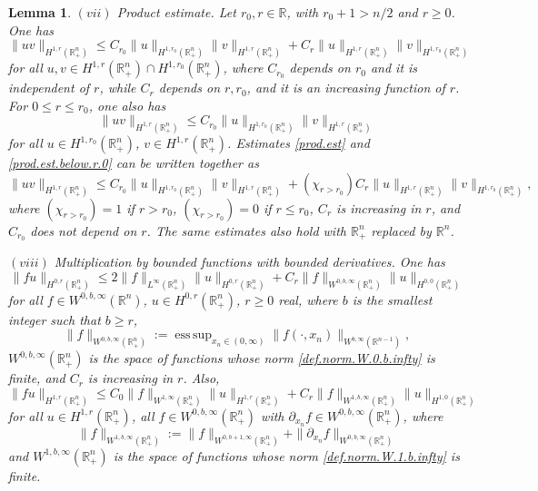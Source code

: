 \documentclass[10pt,reqno,a4paper]{article}
\numberwithin{equation}{section}
\theoremstyle{plain}
\newtheorem{lemma}[theorem]{Lemma}
\theoremstyle{definition}
\newcommand{\R}{{\mathbb R}}
\newcommand{\pa}{\partial}
\DeclareMathOperator*{\esssup}{ess\,sup}
\begin{document}
\begin{lemma}
$(vii)$ \emph{Product estimate}.
Let $r_0, r \in \R$, with $r_0 + 1 > n/2$ and $r \geq 0$. 
One has 
\begin{equation} \label{prod.est}
\| uv \|_{H^{1,r}(\R^n_+)} 
\leq C_{r_0} \| u \|_{H^{1,r_0}(\R^n_+)} \| v \|_{H^{1,r}(\R^n_+)} 
+ C_r \| u \|_{H^{1,r}(\R^n_+)} \| v \|_{H^{1,r_0}(\R^n_+)}
\end{equation}
for all $u,v \in H^{1,r}(\R^n_+) \cap H^{1, r_0}(\R^n_+)$, 
where $C_{r_0}$ depends on $r_0$ and it is independent of $r$, 
while $C_r$ depends on $r, r_0$, 
and it is an increasing function of $r$. 
For $0 \leq r \leq r_0$, one also has
\begin{equation} \label{prod.est.below.r.0}
\| uv \|_{H^{1,r}(\R^n_+)} 
\leq C_{r_0} \| u \|_{H^{1,r_0}(\R^n_+)} \| v \|_{H^{1,r}(\R^n_+)} 
\end{equation}
for all $u \in H^{1,r_0}(\R^n_+)$, 
$v \in H^{1,r}(\R^n_+)$. 
Estimates \eqref{prod.est} and \eqref{prod.est.below.r.0} can be written together as 
\begin{equation} \label{prod.est.unified}
\| uv \|_{H^{1,r}(\R^n_+)} 
\leq C_{r_0} \| u \|_{H^{1,r_0}(\R^n_+)} \| v \|_{H^{1,r}(\R^n_+)} 
+ (\chi_{r > r_0}) C_r \| u \|_{H^{1,r}(\R^n_+)} \| v \|_{H^{1,r_0}(\R^n_+)},
\end{equation}
where $(\chi_{r > r_0}) = 1$ if $r > r_0$, 
$(\chi_{r > r_0}) = 0$ if $r \leq r_0$,
$C_r$ is increasing in $r$, 
and $C_{r_0}$ does not depend on $r$. 
The same estimates also hold with $\R^n_+$ replaced by $\R^n$.

$(viii)$ \emph{Multiplication by bounded functions with bounded derivatives}. 
One has 
\begin{equation} \label{est.prod.infty.0}
\| fu \|_{H^{0,r}(\R^n_+)} 
\leq 2 \| f \|_{L^\infty(\R^n_+)} \| u \|_{H^{0,r}(\R^n_+)} 
+ C_r \| f \|_{W^{0,b,\infty}(\R^n_+)} \| u \|_{H^{0,0}(\R^n_+)}
\end{equation}
for all $f \in W^{0,b,\infty}(\R^n)$, $u \in H^{0,r}(\R^n_+)$, 
$r \geq 0$ real, where $b$ is the smallest integer such that $b \geq r$, 
\begin{equation}  \label{def.norm.W.0.b.infty}
\| f \|_{W^{0,b,\infty}(\R^n_+)} := 
\esssup_{x_n \in (0,\infty)} \| f(\cdot, x_n) \|_{W^{b,\infty}(\R^{n-1})}, 
\end{equation}
$W^{0,b,\infty}(\R^n_+)$ is the space of functions whose norm \eqref{def.norm.W.0.b.infty} 
is finite, and $C_r$ is increasing in $r$. 
Also,
\begin{equation} \label{est.prod.infty.1}
\| fu \|_{H^{1,r}(\R^n_+)} 
\leq C_0 \| f \|_{W^{1,\infty}(\R^n_+)} \| u \|_{H^{1,r}(\R^n_+)} 
+ C_r \| f \|_{W^{1,b,\infty}(\R^n_+)} \| u \|_{H^{1,0}(\R^n_+)}
\end{equation}
for all $u \in H^{1,r}(\R^n_+)$, all $f \in W^{0,b,\infty}(\R^n_+)$ 
with $\pa_{x_n} f \in W^{0,b,\infty}(\R^n_+)$,  
where 
\begin{equation}  \label{def.norm.W.1.b.infty}
\| f \|_{W^{1,b,\infty}(\R^n_+)} := \| f \|_{W^{0,b+1,\infty}(\R^n_+)}
+ \| \pa_{x_n} f \|_{W^{0,b,\infty}(\R^n_+)}
\end{equation}
and $W^{1,b,\infty}(\R^n_+)$ is the space of functions whose norm \eqref{def.norm.W.1.b.infty}
is finite. 


\end{lemma}
\end{document}
